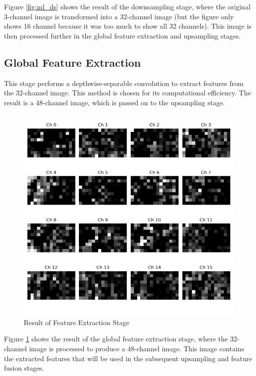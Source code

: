 Figure \ref{fig:ml_ds} shows the result of the downsampling stage, where the original 3-channel image is transformed into a 32-channel image (but the figure only shows 16 channel because it was too much to show all 32 channels). This image is then processed further in the global feature extraction and upsampling stages.

\subsection{Global Feature Extraction}
This stage performs a depthwise-separable convolution to extract features from the 32-channel image. This method is chosen for its computational efficiency. The result is a 48-channel image, which is passed on to the upsampling stage. 
\begin{figure}[H]
	\centering
	\includegraphics[width=\linewidth]{../konten/gf_0.png}
	\caption{Result of Feature Extraction Stage}
	\label{fig:ml_gf}
\end{figure} 
Figure \ref{fig:ml_gf} shows the result of the global feature extraction stage, where the 32-channel image is processed to produce a 48-channel image. This image contains the extracted features that will be used in the subsequent upsampling and feature fusion stages.


